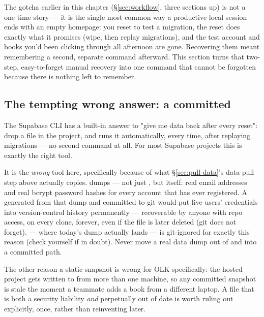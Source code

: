 The  gotcha earlier in this chapter (\S\ref{sec:workflow}, three sections up) is not a one-time story — it is the single most common way a productive local session ends with an empty homepage: you reset to test a migration, the reset does exactly what it promises (wipe, then replay migrations), and the test account and books you'd been clicking through all afternoon are gone. Recovering them meant remembering a second, separate command afterward. This section turns that two-step, easy-to-forget manual recovery into one command that cannot be forgotten because there is nothing left to remember.

\subsection{The tempting wrong answer: a committed }

The Supabase CLI has a built-in answer to "give me data back after every reset": drop a  file in the project, and  runs it automatically, every time, after replaying migrations — no second command at all. For most Supabase projects this is exactly the right tool.

\begin{olkwarn}
It is the \emph{wrong} tool here, specifically because of what \S\ref{sec:pull-data}'s data-pull step above actually copies.  dumps  — not just , but  itself: real email addresses and real bcrypt password hashes for every account that has ever registered. A  generated from that dump and committed to git would put live users' credentials into version-control history permanently — recoverable by anyone with repo access, on every clone, forever, even if the file is later deleted (git does not forget).  — where today's dump actually lands — is git-ignored for exactly this reason (check  yourself if in doubt). Never move a real data dump out of  and into a committed path.
\end{olkwarn}

The other reason a static snapshot is wrong for OLK specifically: the hosted project gets written to from more than one machine, so any committed snapshot is stale the moment a teammate adds a book from a different laptop. A file that is both a security liability \emph{and} perpetually out of date is worth ruling out explicitly, once, rather than reinventing later.

